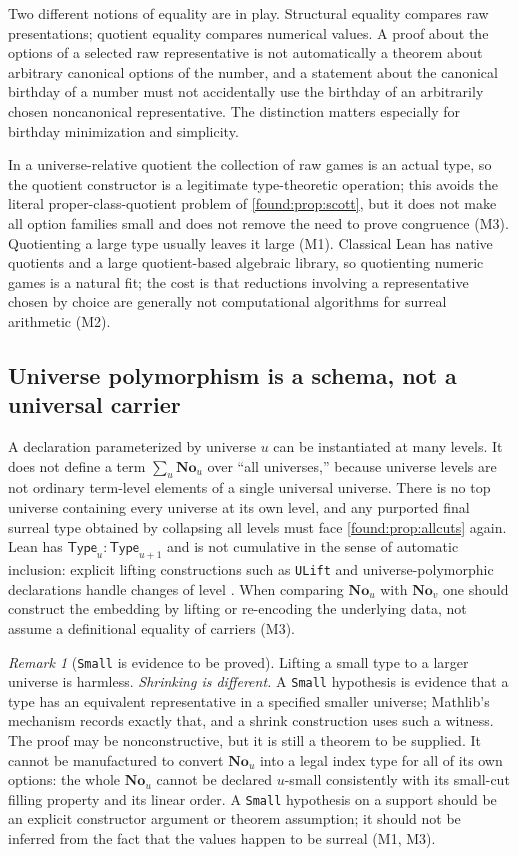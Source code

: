 \documentclass[11pt,letterpaper]{article}
\numberwithin{equation}{section}
\theoremstyle{definition}
\theoremstyle{remark}
\newtheorem{remark}[theorem]{Remark}
\newcommand{\No}{\mathbf{No}}
\newcommand{\Type}{\mathsf{Type}}
\begin{document}
Two different notions of equality are in play. Structural equality compares raw
presentations; quotient equality compares numerical values. A proof about the
options of a selected raw representative is not automatically a theorem about
arbitrary canonical options of the number, and a statement about the canonical
birthday of a number must not accidentally use the birthday of an arbitrarily
chosen noncanonical representative. The distinction matters especially for
birthday minimization and simplicity.

In a universe-relative quotient the collection of raw games is an actual type,
so the quotient constructor is a legitimate type-theoretic operation; this
avoids the literal proper-class-quotient problem of \cref{found:prop:scott}, but
it does not make all option families small and does not remove the need to prove
congruence (M3). Quotienting a large type usually leaves it large (M1).
Classical Lean has native quotients and a large quotient-based algebraic
library, so quotienting numeric games is a natural fit; the cost is that
reductions involving a representative chosen by choice are generally not
computational algorithms for surreal arithmetic (M2).

\subsection{Universe polymorphism is a schema, not a universal carrier}
\label{found:sub:polymorphism}
A declaration parameterized by universe $u$ can be instantiated at many levels.
It does not define a term $\sum_{u}\No_u$ over ``all universes,'' because
universe levels are not ordinary term-level elements of a single universal
universe. There is no top universe containing every universe at its own level,
and any purported final surreal type obtained by collapsing all levels must face
\cref{found:prop:allcuts} again. Lean has $\Type_u:\Type_{u+1}$ and is not
cumulative in the sense of automatic inclusion: explicit lifting constructions
such as \texttt{ULift} and universe-polymorphic declarations handle changes of
level \cite{found:LeanUniverses}. When comparing $\No_u$ with $\No_v$ one should
construct the embedding by lifting or re-encoding the underlying data, not assume
a definitional equality of carriers (M3).

\begin{remark}[\texttt{Small} is evidence to be proved]\label{found:rem:small}
Lifting a small type to a larger universe is harmless. \emph{Shrinking is
different.} A \texttt{Small} hypothesis is evidence that a type has an equivalent
representative in a specified smaller universe; Mathlib's mechanism records
exactly that, and a shrink construction uses such a witness. The proof may be
nonconstructive, but it is still a theorem to be supplied. It cannot be
manufactured to convert $\No_u$ into a legal index type for all of its own
options: the whole $\No_u$ cannot be declared $u$-small consistently with its
small-cut filling property and its linear order. A \texttt{Small} hypothesis on a
support should be an explicit constructor argument or theorem assumption; it
should not be inferred from the fact that the values happen to be surreal (M1,
M3).
\end{remark}
\end{document}
